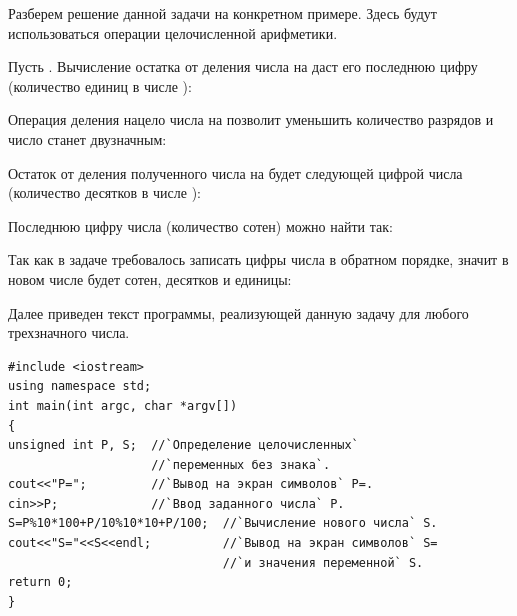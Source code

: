 
Разберем решение данной задачи на конкретном примере. Здесь будут использоваться операции целочисленной арифметики. 

Пусть . Вычисление остатка от деления числа  на  даст
его последнюю цифру (количество единиц в числе ):

Операция деления нацело числа  на  позволит уменьшить количество разрядов и
число станет двузначным:


Остаток от деления полученного числа на  будет следующей цифрой числа 
(количество десятков в числе ):


Последнюю цифру числа  (количество сотен) можно найти так:


Так как в задаче требовалось записать цифры числа  в обратном порядке, значит в новом числе будет
 сотен,  десятков и  единицы:


Далее приведен текст программы, реализующей данную задачу для любого трехзначного числа.

\begin{lstlisting}
#include <iostream>
using namespace std;
int main(int argc, char *argv[])
{
unsigned int P, S;  //`Определение целочисленных`
                    //`переменных без знака`.
cout<<"P=";         //`Вывод на экран символов` P=.
cin>>P;             //`Ввод заданного числа` P.
S=P%10*100+P/10%10*10+P/100;  //`Вычисление нового числа` S.
cout<<"S="<<S<<endl;          //`Вывод на экран символов` S=
                              //`и значения переменной` S.
return 0;
}
\end{lstlisting}


